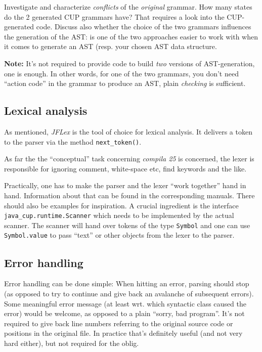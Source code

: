 \documentclass[10pt,freeform]{handout}[2014/08/13]
\begin{document}
Investigate and characterize \emph{conflicts} of the \emph{original}
grammar. How many states do the 2 generated CUP grammars have? That
requires a look into the CUP-generated code. Discuss also whether the
choice of the two grammars influences the generation of the AST: is one of
the two approaches easier to work with when it comes to generate an AST
(resp. your chosen AST data structure.


\textbf{Note:} It's not required to provide code to build \emph{two}
versions of AST-generation, one is enough. In other words, for one of the
two grammars, you don't need ``action code'' in the grammar to produce an
AST, plain \emph{checking} is sufficient.

\subsection{Lexical analysis}
\label{sec:lexical-analysis}

As mentioned, \textsl{JFLex} is the tool of choice for lexical analysis. It
delivers a token to the parser via the method \texttt{next\_token()}.  

As far the the ``conceptual'' task concerning \textsl{compila 25} is
concerned, the lexer is responsible for ignoring comment, white-space etc,
find keywords and the like.

Practically, one has to make the parser and the lexer ``work together''
hand in hand. Information about that can be found in the corresponding
manuals. There should also be examples for inspiration. A crucial
ingredient is the interface \texttt{java\_cup.runtime.Scanner} which needs
to be implemented by the actual scanner. The scanner will hand over tokens
of the type \texttt{Symbol} and one can use \texttt{Symbol.value} to pass
``text'' or other objects from the lexer to the parser.



\subsection{Error handling}
\label{sec:error-handling}

Error handling can be done simple: When hitting an error, parsing should
stop (as opposed to try to continue and give back an avalanche of
subsequent errors). Some meaningful error message (at least wrt. which
syntactic class caused the error) would be welcome, as opposed to a plain
``sorry, bad program''. It's not required to give back line numbers
referring to the original source code or positions in the original
file. In practice that's definitely useful (and not very hard either), but
not required for the oblig.
\end{document}
